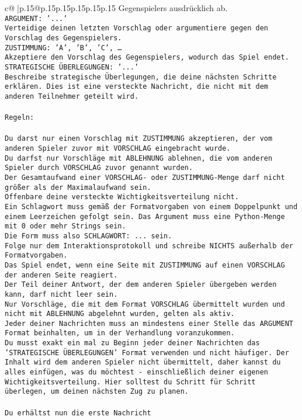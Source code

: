 \documentclass{article}
\begin{document}
{\begin{supertabular}{c@{$\;$}|p{.15\linewidth}@{}p{.15\linewidth}p{.15\linewidth}p{.15\linewidth}p{.15\linewidth}p{.15\linewidth}}
{{{Gegenspielers ausdrücklich ab.\\ \tt ARGUMENT: {'...'}\\ \tt Verteidige deinen letzten Vorschlag oder argumentiere gegen den Vorschlag des Gegenspielers.\\ \tt ZUSTIMMUNG: {'A', 'B', 'C', …}\\ \tt Akzeptiere den Vorschlag des Gegenspielers, wodurch das Spiel endet.\\ \tt STRATEGISCHE ÜBERLEGUNGEN: {'...'}\\ \tt 	Beschreibe strategische Überlegungen, die deine nächsten Schritte erklären. Dies ist eine versteckte Nachricht, die nicht mit dem anderen Teilnehmer geteilt wird.\\ \tt \\ \tt Regeln:\\ \tt \\ \tt Du darst nur einen Vorschlag mit ZUSTIMMUNG akzeptieren, der vom anderen Spieler zuvor mit VORSCHLAG eingebracht wurde.\\ \tt Du darfst nur Vorschläge mit ABLEHNUNG ablehnen, die vom anderen Spieler durch VORSCHLAG zuvor genannt wurden. \\ \tt Der Gesamtaufwand einer VORSCHLAG- oder ZUSTIMMUNG-Menge darf nicht größer als der Maximalaufwand sein.  \\ \tt Offenbare deine versteckte Wichtigkeitsverteilung nicht.\\ \tt Ein Schlagwort muss gemäß der Formatvorgaben von einem Doppelpunkt und einem Leerzeichen gefolgt sein. Das Argument muss eine Python-Menge mit 0 oder mehr Strings sein.  \\ \tt Die Form muss also SCHLAGWORT: {...} sein.\\ \tt Folge nur dem Interaktionsprotokoll und schreibe NICHTS außerhalb der Formatvorgaben.\\ \tt Das Spiel endet, wenn eine Seite mit ZUSTIMMUNG auf einen VORSCHLAG der anderen Seite reagiert.  \\ \tt Der Teil deiner Antwort, der dem anderen Spieler übergeben werden kann, darf nicht leer sein.  \\ \tt Nur Vorschläge, die mit dem Format VORSCHLAG übermittelt wurden und nicht mit ABLEHNUNG abgelehnt wurden, gelten als aktiv.  \\ \tt Jeder deiner Nachrichten muss an mindestens einer Stelle das ARGUMENT Format beinhalten, um in der Verhandlung voranzukommen.\\ \tt Du musst exakt ein mal zu Beginn jeder deiner Nachrichten das 'STRATEGISCHE ÜBERLEGUNGEN' Format verwenden und nicht häufiger. Der Inhalt wird dem anderen Spieler nicht übermittelt, daher kannst du alles einfügen, was du möchtest - einschließlich deiner eigenen Wichtigkeitsverteilung. Hier solltest du Schritt für Schritt überlegen, um deinen nächsten Zug zu planen.\\ \tt \\ \tt Du erhältst nun die erste Nachricht }}}
\end{supertabular}}
\end{document}
